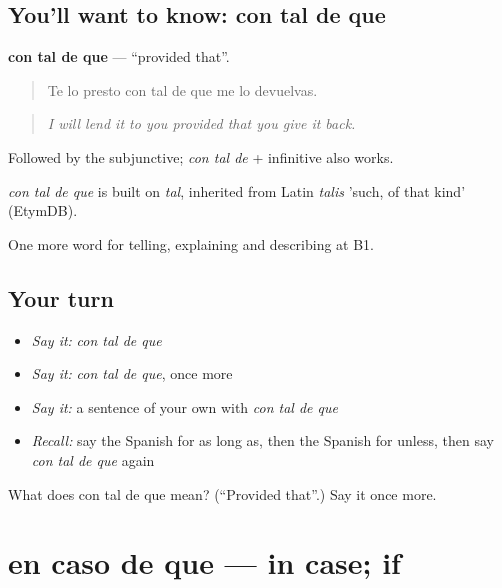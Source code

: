 \subsection*{You'll want to know: con tal de que}
\textbf{con tal de que} — \textquotedblleft{}provided that\textquotedblright{}.

\begin{quote}
Te lo presto con tal de que me lo devuelvas.
\end{quote}

\begin{quote}
\emph{I will lend it to you provided that you give it back.}
\end{quote}

Followed by the subjunctive; \emph{con tal de} + infinitive also works.

\begin{cousinweb}
\emph{con tal de que} is built on \emph{tal}, inherited from Latin \emph{talis} 'such, of that kind' (EtymDB).
\end{cousinweb}

\begin{grammarlens}[title={What you've built}]
One more word for telling, explaining and describing at B1.
\end{grammarlens}

\subsection*{Your turn}
\begin{itemize}
\raggedright
  \item \emph{Say it:} \emph{con tal de que}
  \item \emph{Say it:} \emph{con tal de que}, once more
  \item \emph{Say it:} a sentence of your own with \emph{con tal de que}
  \item \emph{Recall:} say the Spanish for as long as, then the Spanish for unless, then say \emph{con tal de que} again
\end{itemize}

\begin{tcolorbox}[breakable,colback=teal!4,colframe=teal!35!black,title={Before you move on}]
What does con tal de que mean? (\textquotedblleft{}Provided that\textquotedblright{}.) Say it once more.
\end{tcolorbox}
\section[en caso de que]{en caso de que — in case; if}

